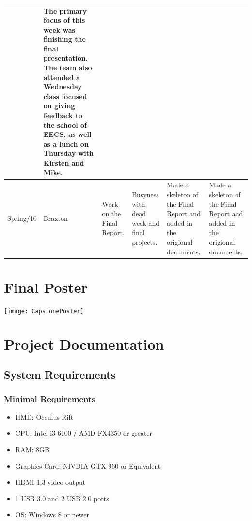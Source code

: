 \documentclass[onecolumn, draftclsnofoot,10pt, compsoc]{IEEEtran}
\begin{document}
\begin{tiny}
\begin{longtable}{ | p{} | p{} | p{} | p{} | p{} | p{} | }
&
The primary focus of this week was finishing the final presentation. The team also attended a Wednesday class focused on giving feedback to the school of EECS, as well as a lunch on Thursday with Kirsten and Mike. 
\\ \hline
Spring/10 & Braxton & 

Work on the Final Report.

&

Busyness with dead week and final projects.

&

Made a skeleton of the Final Report and added in the origional documents.

&

Made a skeleton of the Final Report and added in the origional documents.

\\ \hline
\hline 
\end{longtable}
\end{tiny}


\section{Final Poster}
\texttt{[image: CapstonePoster]}


\section{Project Documentation}

\subsection{System Requirements}
\subsubsection{Minimal Requirements}
\begin{itemize}
\item HMD: Occulus Rift
\item CPU: Intel i3-6100 / AMD FX4350 or greater
\item RAM: 8GB
\item Graphics Card: NIVDIA GTX 960 or Equivalent
\item HDMI 1.3 video output
\item 1 USB 3.0 and 2 USB 2.0 ports
\item OS: Windows 8 or newer
\end{itemize}
\end{document}
